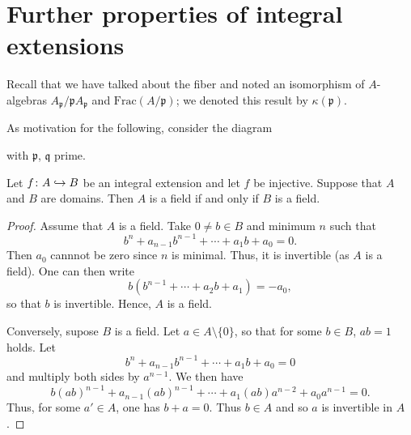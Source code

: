 \section{Further properties of integral extensions}

Recall that we have talked about the fiber and noted an isomorphism of $A$-algebras $A_{\mathfrak p} /{ \mathfrak p A_{\mathfrak p}}$ and $\text{Frac}(A/{\mathfrak p})$; we denoted this result by $\kappa(\mathfrak p)$.


As motivation for the following, consider the diagram
with $\mathfrak p$, $\mathfrak q$ prime.

\begin{lemma}
  \label{integral extensions of domains propagate fields}
  Let $f \colon A \hookrightarrow B$ be an integral extension and let $f$ be injective. Suppose that $A$ and $B$ are domains. Then $A$ is a field if and only if $B$ is a field.
\end{lemma}
\begin{proof}
  Assume that $A$ is a field. Take $0 \neq b \in B$ and minimum $n$ such that
  \[ b^n + a_{n-1} b^{n-1} + \dotsb + a_1b + a_0 = 0.\]
  Then $a_0$ cannnot be zero since $n$ is minimal. Thus, it is invertible (as $A$ is a field). One can then write
  \[ b (b^{n-1} + \dotsb + a_2b + a_1) = - a_0,\]
  so that $b$ is invertible. Hence, $A$ is a field.

  Conversely, supose $B$ is a field. Let $a \in A\setminus\{0\}$, so that for some $b \in B$, $ab=1$ holds. Let
  \[ b^n + a_{n-1}b^{n-1} + \dotsb + a_1 b + a_0 = 0\]
  and multiply both sides by $a^{n-1}$.
  We then have
  \[ b (ab)^{n-1} + a_{n-1} (ab)^{n-1} + \dotsb + a_1 (ab) a^{n-2} + a_0 a^{n-1} = 0.\]
  Thus, for some $a' \in A$, one has $b+a=0$. Thus $b \in A$ and so $a$ is invertible in $A$.
\end{proof}

